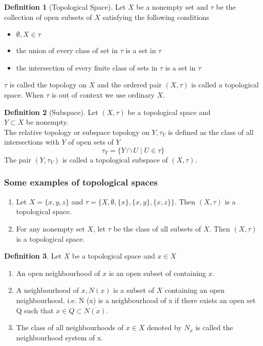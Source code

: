 \documentclass[a4paper, 12pt]{scrbook}
\theoremstyle{definition}
\newtheorem{defn}{Definition}[section]
\begin{document}
    \begin{defn}[Topological Space]
        Let $X$ be a nonempty set and $\tau$ be the collection of open subsets of $X$ satisfying the following conditions
        \begin{itemize}
            \item[1.] $\emptyset, X \in \tau$
            \item[2.] the union of every class of set in $\tau$ is a set in $\tau$
            \item[3.] the intersection of every finite class of sets in $\tau$ is a set in $\tau$
        \end{itemize}
        $\tau$ is called the topology on $X$ and the ordered pair $(X, \tau)$ is called a topological space. When $\tau$ is out of context we use ordinary $X$.
    \end{defn}

    \begin{defn}[Subspace]
        Let $(X, \tau)$ be a topological space and\\
         $Y \subset X$ be nonempty.\\
        The relative topology or subspace topology on $Y, \tau_Y$ is defined as the class of all intersections with $Y$ of open sets of $Y$
        \[
            \tau_Y = \{Y \cap U  \mid U \in \tau\}
        \]
        The pair $(Y, \tau_Y)$ is called a topological subspace of $(X, \tau)$.
    \end{defn}

    \subsubsection*{Some examples of topological spaces}
    \begin{enumerate}
        \item Let $X = \{x,y,z\}$ and $\tau = \{X, \emptyset, \{x\}, \{x,y\}, \{x,z\}\}$. Then $(X, \tau)$ is a topological space.
        \item For any nonempty set $X$, let $\tau$ be the class of all  subsets of $X$. Then $(X, \tau)$ is a topological space.
    \end{enumerate}

    \begin{defn}
        Let $X$ be a topological space and $x \in X$ 
        \begin{enumerate}
            \item An open neighbourhood of $x$ is an open subset of containing $x$.
            \item A neighbourhood of $x, N(x)$ is a subset of $X$ containing an open neighbourhood. i.e. N (x) is a neighbourhood of x if there exists an open set Q such that $x \in Q \subset N (x)$.
            \item The class of all neighbourhoods of $x \in X$ denoted by $N_x$ is called the neighbourhood system of x.
        \end{enumerate}
    \end{defn}
\end{document}
